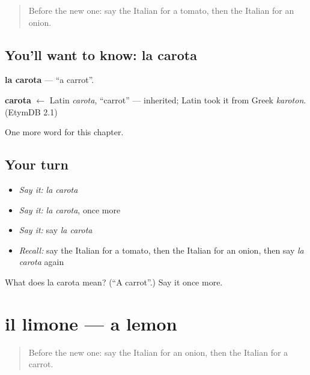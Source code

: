 \label{lesson:IT-C53-carota}



\begin{quote}
Before the new one: say the Italian for a tomato, then the Italian for an onion.
\end{quote}

\subsection*{You'll want to know: la carota}
\textbf{la carota} — \textquotedblleft{}a carrot\textquotedblright{}.

\begin{cousinweb}
\textbf{carota} $\leftarrow$ Latin \emph{carota}, \textquotedblleft{}carrot\textquotedblright{} — inherited; Latin took it from Greek \emph{karoton}. (EtymDB 2.1)
\end{cousinweb}

\begin{grammarlens}[title={What you've built}]
One more word for this chapter.
\end{grammarlens}

\subsection*{Your turn}
\begin{itemize}
\raggedright
  \item \emph{Say it:} \emph{la carota}
  \item \emph{Say it:} \emph{la carota}, once more
  \item \emph{Say it:} say \emph{la carota}
  \item \emph{Recall:} say the Italian for a tomato, then the Italian for an onion, then say \emph{la carota} again
\end{itemize}

\begin{tcolorbox}[breakable,colback=teal!4,colframe=teal!35!black,title={Before you move on}]
What does la carota mean? (\textquotedblleft{}A carrot\textquotedblright{}.) Say it once more.
\end{tcolorbox}
\section[il limone]{il limone — a lemon}

\label{lesson:IT-C53-limone}



\begin{quote}
Before the new one: say the Italian for an onion, then the Italian for a carrot.
\end{quote}

